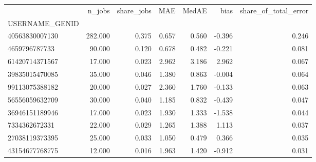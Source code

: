 \begin{tabular}{lrrrrrr}
\toprule
 & n_jobs & share_jobs & MAE & MedAE & bias & share_of_total_error \\
USERNAME_GENID &  &  &  &  &  &  \\
\midrule
40563830007130 & 282.000 & 0.375 & 0.657 & 0.560 & -0.396 & 0.246 \\
4659796787733 & 90.000 & 0.120 & 0.678 & 0.482 & -0.221 & 0.081 \\
61420714371567 & 17.000 & 0.023 & 2.962 & 3.186 & 2.962 & 0.067 \\
39835015470085 & 35.000 & 0.046 & 1.380 & 0.863 & -0.004 & 0.064 \\
99113075388182 & 20.000 & 0.027 & 2.360 & 1.760 & -0.133 & 0.063 \\
56556059632709 & 30.000 & 0.040 & 1.185 & 0.832 & -0.439 & 0.047 \\
36946151189946 & 17.000 & 0.023 & 1.930 & 1.333 & -1.538 & 0.044 \\
7334362672331 & 22.000 & 0.029 & 1.265 & 1.388 & 1.113 & 0.037 \\
27038119373395 & 25.000 & 0.033 & 1.050 & 0.479 & 0.366 & 0.035 \\
43154677768775 & 12.000 & 0.016 & 1.963 & 1.420 & -0.912 & 0.031 \\
\bottomrule
\end{tabular}
